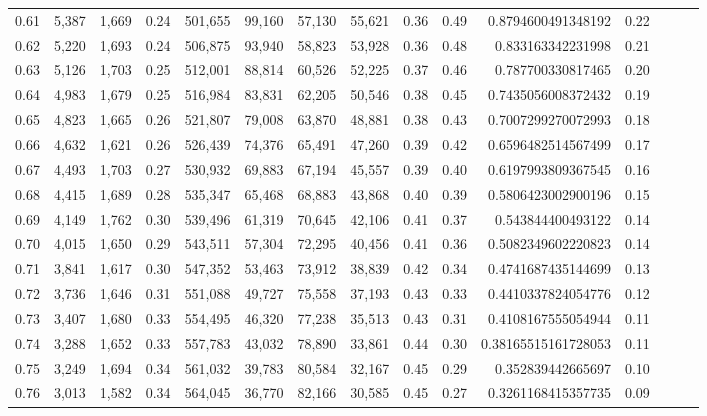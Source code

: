 \begin{tabular}{rrrrrrrrrrrrrrr}
0.61 &   5,387 &  1,669 &  0.24 &  501,655 &   99,160 &   57,130 &   55,621 &  0.36 &  0.49 &     0.8794600491348192 &      0.22 \\
0.62 &   5,220 &  1,693 &  0.24 &  506,875 &   93,940 &   58,823 &   53,928 &  0.36 &  0.48 &      0.833163342231998 &      0.21 \\
0.63 &   5,126 &  1,703 &  0.25 &  512,001 &   88,814 &   60,526 &   52,225 &  0.37 &  0.46 &      0.787700330817465 &      0.20 \\
0.64 &   4,983 &  1,679 &  0.25 &  516,984 &   83,831 &   62,205 &   50,546 &  0.38 &  0.45 &     0.7435056008372432 &      0.19 \\
0.65 &   4,823 &  1,665 &  0.26 &  521,807 &   79,008 &   63,870 &   48,881 &  0.38 &  0.43 &     0.7007299270072993 &      0.18 \\
0.66 &   4,632 &  1,621 &  0.26 &  526,439 &   74,376 &   65,491 &   47,260 &  0.39 &  0.42 &     0.6596482514567499 &      0.17 \\
0.67 &   4,493 &  1,703 &  0.27 &  530,932 &   69,883 &   67,194 &   45,557 &  0.39 &  0.40 &     0.6197993809367545 &      0.16 \\
0.68 &   4,415 &  1,689 &  0.28 &  535,347 &   65,468 &   68,883 &   43,868 &  0.40 &  0.39 &     0.5806423002900196 &      0.15 \\
0.69 &   4,149 &  1,762 &  0.30 &  539,496 &   61,319 &   70,645 &   42,106 &  0.41 &  0.37 &      0.543844400493122 &      0.14 \\
0.70 &   4,015 &  1,650 &  0.29 &  543,511 &   57,304 &   72,295 &   40,456 &  0.41 &  0.36 &     0.5082349602220823 &      0.14 \\
0.71 &   3,841 &  1,617 &  0.30 &  547,352 &   53,463 &   73,912 &   38,839 &  0.42 &  0.34 &     0.4741687435144699 &      0.13 \\
0.72 &   3,736 &  1,646 &  0.31 &  551,088 &   49,727 &   75,558 &   37,193 &  0.43 &  0.33 &     0.4410337824054776 &      0.12 \\
0.73 &   3,407 &  1,680 &  0.33 &  554,495 &   46,320 &   77,238 &   35,513 &  0.43 &  0.31 &     0.4108167555054944 &      0.11 \\
0.74 &   3,288 &  1,652 &  0.33 &  557,783 &   43,032 &   78,890 &   33,861 &  0.44 &  0.30 &    0.38165515161728053 &      0.11 \\
0.75 &   3,249 &  1,694 &  0.34 &  561,032 &   39,783 &   80,584 &   32,167 &  0.45 &  0.29 &      0.352839442665697 &      0.10 \\
0.76 &   3,013 &  1,582 &  0.34 &  564,045 &   36,770 &   82,166 &   30,585 &  0.45 &  0.27 &     0.3261168415357735 &      0.09 \\

\end{tabular}
